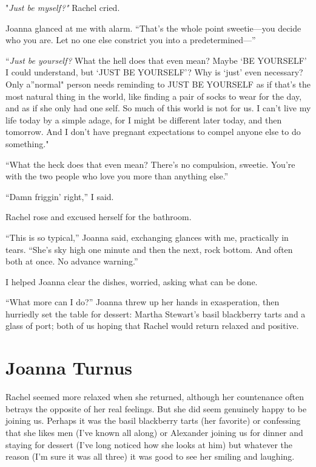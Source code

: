"\emph{Just be myself?"} Rachel cried.

Joanna glanced at me with alarm. ``That's the whole point sweetie---you
decide who you are. Let no one else constrict you into a
pre\-de\-ter\-mined---''

``\emph{Just be yourself?} What the hell does that even mean? Maybe `BE
YOURSELF' I could understand, but `JUST BE YOURSELF'? Why is `just' even
necessary? Only a''normal" person needs reminding to JUST BE YOURSELF as
if that's the most natural thing in the world, like finding a pair of
socks to wear for the day, and as if she only had one self. So much of
this world is not for us. I can't live my life today by a simple adage,
for I might be different later today, and then tomorrow. And I don't
have pregnant expectations to compel anyone else to do something."

``What the heck does that even mean? There's no compulsion, sweetie.
You're with the two people who love you more than anything else.''

``Damn friggin' right,'' I said.

Rachel rose and excused herself for the bathroom.

``This is so typical,'' Joanna said, exchanging glances with me,
practically in tears. ``She's sky high one minute and then the next,
rock bottom. And often both at once. No advance warning.''

I helped Joanna clear the dishes, worried, asking what can be done.

``What more can I do?'' Joanna threw up her hands in exasperation, then
hurriedly set the table for dessert: Martha Stewart's basil blackberry
tarts and a glass of port; both of us hoping that Rachel would return
relaxed and positive.

\chapter{Joanna Turnus}

\titlemark

Rachel seemed more relaxed when she returned, although her countenance
often betrays the opposite of her real feelings. But she did seem
genuinely happy to be joining us. Perhaps it was the basil blackberry
tarts (her favorite) or confessing that she likes men (I've known all
along) or Alexander joining us for dinner and staying for dessert (I've
long noticed how she looks at him) but whatever the reason (I'm sure it
was all three) it was good to see her smiling and laughing.

